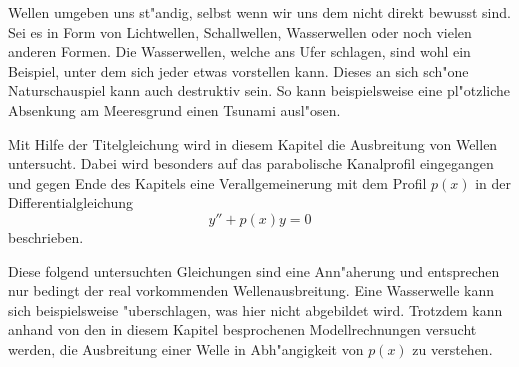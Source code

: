 Wellen umgeben uns st"andig, selbst wenn wir uns dem nicht direkt bewusst sind. 
Sei es in Form von Lichtwellen, Schallwellen, Wasserwellen oder noch vielen 
anderen Formen. Die Wasserwellen, welche ans Ufer schlagen, sind wohl ein 
Beispiel, unter dem sich jeder etwas vorstellen kann. Dieses an sich sch"one 
Naturschauspiel kann auch destruktiv sein. So kann beispielsweise eine 
pl"otzliche Absenkung am Meeresgrund einen Tsunami ausl"osen.

Mit Hilfe der Titelgleichung wird in diesem Kapitel die Ausbreitung von Wellen 
untersucht. Dabei wird besonders auf das parabolische Kanalprofil eingegangen 
und gegen Ende des Kapitels eine Verallgemeinerung mit dem Profil 
$p(x)$ in der Differentialgleichung
\begin{equation}
	y'' + p(x) y = 0
	\label{eq:wellen:pxdgl}
\end{equation}
beschrieben.

Diese folgend untersuchten Gleichungen sind eine Ann"aherung und entsprechen 
nur bedingt der real vorkommenden Wellenausbreitung. Eine Wasserwelle 
kann sich beispielsweise "uberschlagen, was hier nicht abgebildet wird. 
Trotzdem kann anhand von den in diesem Kapitel besprochenen Modellrechnungen 
versucht werden, die Ausbreitung einer Welle in Abh"angigkeit von $p(x)$ zu 
verstehen.
